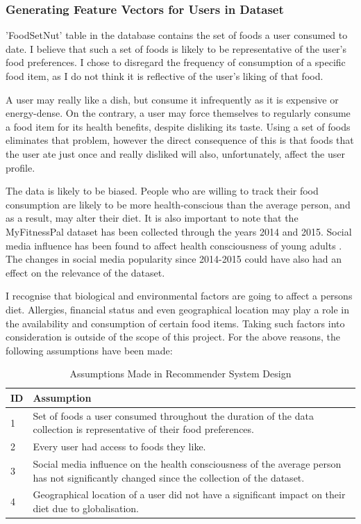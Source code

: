 \documentclass{article}
\begin{document}
\subsubsection{Generating Feature Vectors for Users in Dataset}
'FoodSetNut' table in the database contains the set of foods a user consumed to date. I believe that such a set of foods is likely to be representative of the user's food preferences. I chose to disregard the frequency of consumption of a specific food item, as I do not think it is reflective of the user's liking of that food. 

\bigskip
\noindent A user may really like a dish, but consume it infrequently as it is expensive or energy-dense. On the contrary, a user may force themselves to regularly consume a food item for its health benefits, despite disliking its taste. Using a set of foods eliminates that problem, however the direct consequence of this is that foods that the user ate just once and really disliked will also, unfortunately, affect the user profile.

\bigskip
\noindent The data is likely to be biased. People who are willing to track their food consumption are likely to be more health-conscious than the average person, and as a result, may alter their diet. It is also important to note that the MyFitnessPal dataset \cite{diet_success_predictions} has been collected through the years 2014 and 2015. Social media influence has been found to affect health consciousness of young adults \cite{getting_healthy}. The changes in social media popularity since 2014-2015 could have also had an effect on the relevance of the dataset. 

\bigskip
\noindent I recognise that biological and environmental factors are going to affect a persons diet. Allergies, financial status and even geographical location may play a role in the availability and consumption of certain food items. Taking such factors into consideration is outside of the scope of this project. For the above reasons, the following assumptions have been made: 

\begin{table}[h]
\centering
\hspace*{-0.75cm}
\begin{tabular}{||m{0.5cm}|m{11.5cm}||}
\hline
    ID & Assumption \\ [0.5ex] 
    \hline
    1 & Set of foods a user consumed throughout the duration of the data collection is representative of their food preferences.\\
    \hline
    2 &  Every user had access to foods they like.\\
    \hline
    3 &  Social media influence on the health consciousness of the average person has not significantly changed since the collection of the dataset.\\
    \hline
    4 &  Geographical location of a user did not have a significant impact on their diet due to globalisation.\\
\hline
\end{tabular}
\caption{Assumptions Made in Recommender System Design}
\label{table:recommender_system_assumptions}
\end{table}
\end{document}
